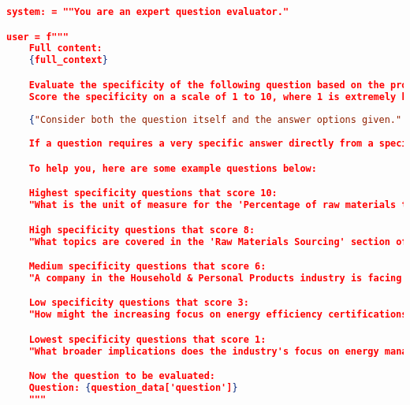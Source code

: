 \begin{lstlisting}[language=JSON,firstnumber=1,label={lst:qa_eval_prompt},caption={Few-shot prompt for domain specificity}]
system: = ""You are an expert question evaluator."

user = f"""
    Full content:
    {full_context}

    Evaluate the specificity of the following question based on the provided context and compared to the highly specific question examples provided.
    Score the specificity on a scale of 1 to 10, where 1 is extremely broad or general and 10 is very specific. 
    
    {"Consider both the question itself and the answer options given." if is_multiple_choice else "Consider the question and the expected level of detail in the answer."}
    
    If a question requires a very specific answer directly from a specific sentence/part of the document, it is considered more specific. If a question can be answered in multiple ways or is broad, it is considered less specific.

    To help you, here are some example questions below:

    Highest specificity questions that score 10:
    "What is the unit of measure for the 'Percentage of raw materials third-party certified to an environmental and/or social sustainability standard, by standard' metric in the Apparel, Accessories & Footwear industry (as listed in the relevant table)?"

    High specificity questions that score 8:
    "What topics are covered in the 'Raw Materials Sourcing' section of the Apparel, Accessories & Footwear document, and what are the key takeaways for a company writing its sustainability report in this industry?"

    Medium specificity questions that score 6:
    "A company in the Household & Personal Products industry is facing water scarcity issues in multiple manufacturing locations. What is the most comprehensive approach to address this challenge in their sustainability report?"

    Low specificity questions that score 3:
    "How might the increasing focus on energy efficiency certifications in the appliance industry influence future regulatory trends and consumer behaviour?"

    Lowest specificity questions that score 1:
    "What broader implications does the industry's focus on energy management have for environmental sustainability?"

    Now the question to be evaluated:
    Question: {question_data['question']}
    """
\end{lstlisting}


